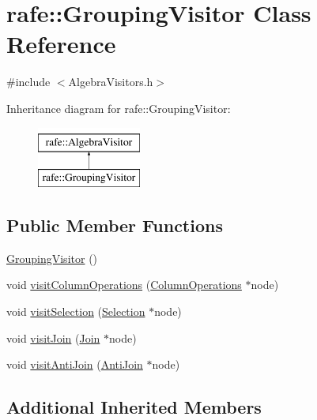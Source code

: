 \hypertarget{classrafe_1_1_grouping_visitor}{\section{rafe\+:\+:Grouping\+Visitor Class Reference}
\label{classrafe_1_1_grouping_visitor}
}


{\ttfamily \#include $<$Algebra\+Visitors.\+h$>$}

Inheritance diagram for rafe\+:\+:Grouping\+Visitor\+:\begin{figure}[H]
\begin{center}
\leavevmode
\includegraphics[height=2.000000cm]{classrafe_1_1_grouping_visitor}
\end{center}
\end{figure}
\subsection*{Public Member Functions}
\begin{DoxyCompactItemize}
\item 
\hyperlink{classrafe_1_1_grouping_visitor_a33accac3eae9e1ecb557acf7c7867d45}{Grouping\+Visitor} ()
\item 
void \hyperlink{classrafe_1_1_grouping_visitor_acb0f1d2cd1d7432d812191841efc6f60}{visit\+Column\+Operations} (\hyperlink{classrafe_1_1_column_operations}{Column\+Operations} $\ast$node)
\item 
void \hyperlink{classrafe_1_1_grouping_visitor_a7287bb0601e55028ef362604144eae23}{visit\+Selection} (\hyperlink{classrafe_1_1_selection}{Selection} $\ast$node)
\item 
void \hyperlink{classrafe_1_1_grouping_visitor_a519732d6b549b84cd543ab61aa7630f1}{visit\+Join} (\hyperlink{classrafe_1_1_join}{Join} $\ast$node)
\item 
void \hyperlink{classrafe_1_1_grouping_visitor_aa5f7889f7fc5ec289d7ee1107b441c0c}{visit\+Anti\+Join} (\hyperlink{classrafe_1_1_anti_join}{Anti\+Join} $\ast$node)
\end{DoxyCompactItemize}
\subsection*{Additional Inherited Members}


